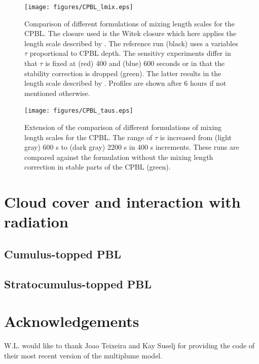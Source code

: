 \documentclass[dvipdfmx,a4paper,10pt]{article}
\begin{document}
\begin{figure}[bthp]
\centering
 \texttt{[image: figures/CPBL\_lmix.eps]}
\caption{Comparison of different formulations of mixing length scales for the CPBL. The closure used is the Witek closure which here applies the length scale described by \cite{suselj13}. The reference run (black) uses a variables $\tau$ proportional to CPBL depth. The sensitivy experiments differ in that $\tau$ is fixed at (red) 400 and (blue) 600 seconds or in that the stability correction is dropped (green). The latter results in the length scale described by \cite{teixeira04}. Profiles are shown after 6 hours if not mentioned otherwise.} \label{fig:lmix}
\end{figure}
\begin{figure}[bthp]
\centering
 \texttt{[image: figures/CPBL\_taus.eps]}
\caption{Extension of the comparison of different formulations of mixing length scales for the CPBL. The range of $\tau$ is increased from (light gray) 600 s to (dark gray) 2200 s in 400 s increments. These runs are compared against the formulation without the mixing length correction in stable parts of the CPBL (green).} \label{fig:taus}
\end{figure}

\section{Cloud cover and interaction with radiation}\label{sec:clouds}

\subsection{Cumulus-topped PBL}

\subsection{Stratocumulus-topped PBL}



\section{Acknowledgements}
W.L. would like to thank Joao Teixeira and Kay Suselj for providing the code of their most recent version of the multiplume model. 




%

 
\end{document}
